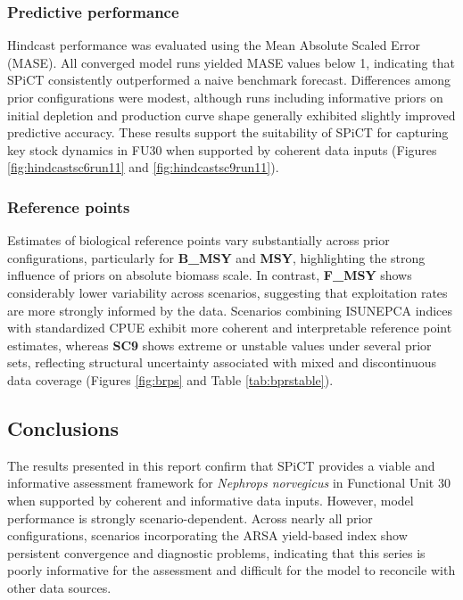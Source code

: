 \documentclass[
  12pt,
]{article}
\begin{document}
\subsubsection{Predictive performance}\label{predictive-performance}

Hindcast performance was evaluated using the Mean Absolute Scaled Error (MASE). All converged model runs yielded MASE values below 1, indicating that SPiCT consistently outperformed a naive benchmark forecast. Differences among prior configurations were modest, although runs including informative priors on initial depletion and production curve shape generally exhibited slightly improved predictive accuracy. These results support the suitability of SPiCT for capturing key stock dynamics in FU30 when supported by coherent data inputs (Figures \ref{fig:hindcastsc6run11} and \ref{fig:hindcastsc9run11}).

\subsubsection{Reference points}\label{reference-points}

Estimates of biological reference points vary substantially across prior configurations, particularly for \textbf{B\_MSY} and \textbf{MSY}, highlighting the strong influence of priors on absolute biomass scale. In contrast, \textbf{F\_MSY} shows considerably lower variability across scenarios, suggesting that exploitation rates are more strongly informed by the data. Scenarios combining ISUNEPCA indices with standardized CPUE exhibit more coherent and interpretable reference point estimates, whereas \textbf{SC9} shows extreme or unstable values under several prior sets, reflecting structural uncertainty associated with mixed and discontinuous data coverage (Figures \ref{fig:brps} and Table \ref{tab:bprstable}).

\newpage

\subsection{Conclusions}\label{conclusions}

The results presented in this report confirm that SPiCT provides a viable and informative assessment framework for \emph{Nephrops norvegicus} in Functional Unit 30 when supported by coherent and informative data inputs. However, model performance is strongly scenario-dependent. Across nearly all prior configurations, scenarios incorporating the ARSA yield-based index show persistent convergence and diagnostic problems, indicating that this series is poorly informative for the assessment and difficult for the model to reconcile with other data sources.
\end{document}
